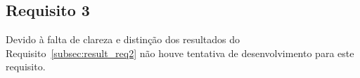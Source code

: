 \subsection{Requisito 3}
    \label{subsec:result_req3}
Devido à falta de clareza e distinção dos resultados do Requisito~\ref{subsec:result_req2} não houve tentativa de desenvolvimento para este requisito.
